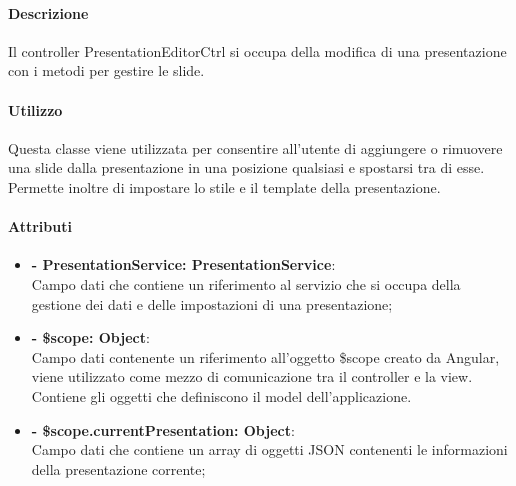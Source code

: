 	\paragraph{Descrizione}
	Il controller PresentationEditorCtrl si occupa della modifica di una presentazione con i metodi per gestire le slide.
	
	\paragraph{Utilizzo}
	Questa classe viene utilizzata per consentire all'utente di aggiungere o rimuovere una slide dalla presentazione in una posizione qualsiasi e spostarsi tra di esse. Permette inoltre di impostare lo stile e il template della presentazione.
	
	\paragraph{Attributi}
	\begin{itemize}
		\item \textbf{- PresentationService: PresentationService}:\\
			Campo dati che contiene un riferimento al servizio che si occupa della gestione dei dati e delle impostazioni di una presentazione;
		\item \textbf{- \$scope: Object}:\\
			Campo dati contenente un riferimento all'oggetto \$scope creato da Angular, viene utilizzato come mezzo di comunicazione tra il controller e la view. Contiene gli oggetti che definiscono il model dell'applicazione.
		\item \textbf{- \$scope.currentPresentation: Object}:\\
			Campo dati che contiene un array di oggetti JSON contenenti le informazioni della presentazione corrente;		
		
	\end{itemize}
	
